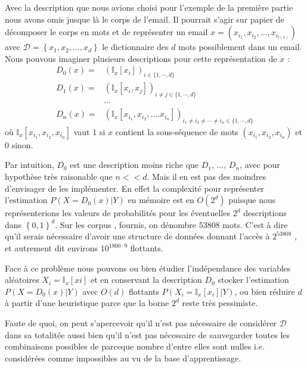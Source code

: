 \documentclass[a4paper, french]{article}
\begin{document}
Avec la description que nous avions choisi pour l'exemple de la premi\`ere partie 
nous avons omis jusque l\`a le corps de l'email. Il pourrait s'agir sur papier de 
d\'ecomposer le corps en mots et de repr\'esenter un email 
$x=\left(x_{i_1},x_{i_2},\ldots,x_{i_{l(x)}}\right)$ 
avec $\mathcal{D}=\left\{x_1,x_2,\ldots,x_d\right\}$ le dictionnaire des $d$ 
mots possiblement dans un email. Nous pouvous imaginer plusieurs descriptions pour
cette repr\'esentation de $x$ :
\begin{align*}
    \label{eq:description_vect}
    D_0(x) = &\left(\mathbb{I}_x[x_{i}]\right)_{i\in\{1,\cdots,d\}}\\
    D_1(x) = &\left(\mathbb{I}_x[x_{i},x_{j}]\right)_{i\neq j\in\{1,\cdots,d\}}\\
             &\cdots\\
    D_n(x) = &\left(\mathbb{I}_x[x_{i_1},x_{i_2},\ldots.x_{i_n}]\right)%
    _{i_1\neq i_2\neq \cdots \neq i_n\in\{1,\cdots,d\}}
\end{align*}
o\`u $\mathbb{I}_x[x_{i_1},x_{i_2},x_{i_n}]$ vaut $1$ si $x$ contient 
la sous-s\'equence de mots $(x_{i_1},x_{i_2},x_{i_n})$ et $0$ sinon.

Par intuition, $D_0$ est une description moins riche que $D_1$, $\ldots$, 
$D_n$, avec pour hypoth\`ese tr\`es raisonable que $n<<d$.
Mais il en est pas des moindres d'envisager de les impl\'ementer.
En effet la complexit\'e pour repr\'esenter l'estimation $P(X=D_0(x)|Y)$ 
en m\'emoire est en $O(2^d)$ puisque nous repr\'esenterions les valeurs de
probabilit\'es pour les \'eventuelles $2^d$ descriptions dans 
$\left\{0,1\right\}^d$. Sur les corpus ,  
fournis, on d\'enombre $53808$ mots. C'est \`a dire qu'il serais n\'ecessaire
d'avoir une structure de donn\'ees donnant l'acc\`es \`a $2^{53808}$ 
, et autrement dit environs $10^{1800\cdot9}$ flottants.

Face \`a ce probl\`eme nous pouvons ou bien \'etudier 
l'ind\'ependance des variables al\'eatoires $X_i=\mathbb{I}_x[xi]$ 
et en conservant la description $D_0$ stocker l'estimation $P(X=D_0(x)|Y)$
avec $O(d)$ flottants $P(X_i=\mathbb{I}_x[x_i]|Y)$, ou bien r\'eduire $d$
\`a partir d'une heuristique parce que la borne $2^d$ reste tr\`es pessimiste.

Faute de quoi, on peut s'apercevoir qu'il n'est pas n\'ecessaire de
consid\'erer $\mathcal{D}$ dans sa totalit\'ee aussi bien qu'il n'est pas
n\'ecessaire de sauvegarder toutes les combinaisons possibles de parceque
nombre d'entre elles sont nulles i.e. consid\'er\'ees comme impossibles au vu
de la base d'apprentissage.
\end{document}
